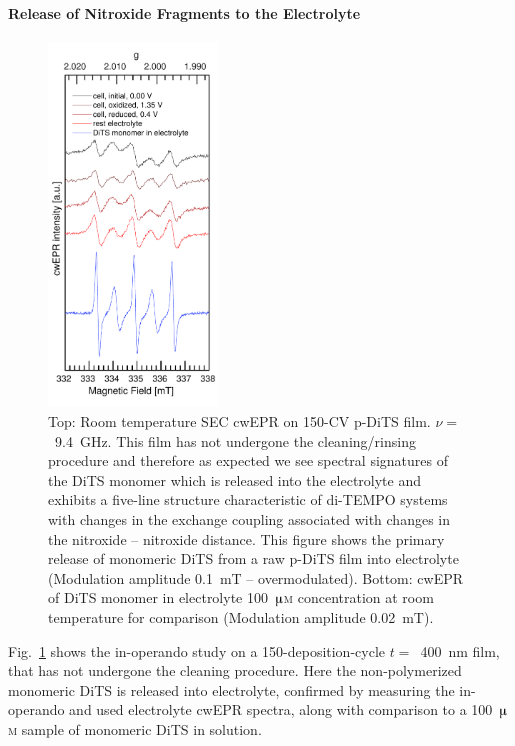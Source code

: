 \paragraph{Release of Nitroxide Fragments to the Electrolyte}
\begin{figure}[H]
\centering
\includegraphics[width=0.40\textwidth]{./operando_epr/figures/Figure_S5}
\caption{Top: Room temperature SEC cwEPR on 150-CV p-DiTS film. $\nu=$~9.4~GHz. This film has not undergone the cleaning/rinsing procedure and therefore as expected we see spectral signatures of the DiTS monomer which is released into the electrolyte and exhibits a five-line structure characteristic of di-TEMPO systems with changes in the exchange coupling associated with changes in the nitroxide -- nitroxide distance. This figure shows the primary release of monomeric DiTS from a raw p-DiTS film into electrolyte (Modulation amplitude 0.1~mT -- overmodulated). Bottom: cwEPR of DiTS monomer in electrolyte 100~$\muup$\textsc{m} concentration at room temperature for comparison (Modulation amplitude 0.02~mT).}
\label{fig:S5}
\end{figure}
Fig.~\ref{fig:S5} shows the in-operando study on a 150-deposition-cycle $t =$~400~nm film, that has not undergone the cleaning procedure. Here the non-polymerized monomeric DiTS is released into electrolyte, confirmed by measuring the in-operando and used electrolyte cwEPR spectra, along with comparison to a 100~$\muup$\textsc{m} sample of monomeric DiTS in solution.
\newpage

